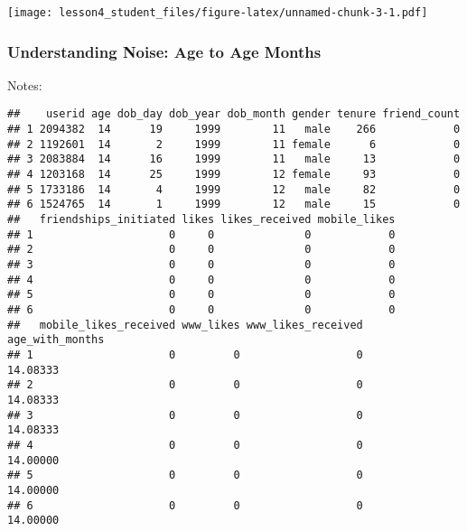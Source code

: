 \documentclass[]{article}
\newenvironment{Shaded}{\begin{snugshade}}{\end{snugshade}}
\newcommand{\KeywordTok}[1]{\textcolor[rgb]{0.13,0.29,0.53}{\textbf{#1}}}
\newcommand{\DataTypeTok}[1]{\textcolor[rgb]{0.13,0.29,0.53}{#1}}
\newcommand{\DecValTok}[1]{\textcolor[rgb]{0.00,0.00,0.81}{#1}}
\newcommand{\StringTok}[1]{\textcolor[rgb]{0.31,0.60,0.02}{#1}}
\newcommand{\OperatorTok}[1]{\textcolor[rgb]{0.81,0.36,0.00}{\textbf{#1}}}
\newcommand{\NormalTok}[1]{#1}
\begin{document}
\begin{Shaded}
\end{Shaded}

\texttt{[image: lesson4\_student\_files/figure-latex/unnamed-chunk-3-1.pdf]}

\subsubsection{Understanding Noise: Age to Age
Months}\label{understanding-noise-age-to-age-months}

Notes:

\begin{Shaded}
\end{Shaded}

\begin{verbatim}
##    userid age dob_day dob_year dob_month gender tenure friend_count
## 1 2094382  14      19     1999        11   male    266            0
## 2 1192601  14       2     1999        11 female      6            0
## 3 2083884  14      16     1999        11   male     13            0
## 4 1203168  14      25     1999        12 female     93            0
## 5 1733186  14       4     1999        12   male     82            0
## 6 1524765  14       1     1999        12   male     15            0
##   friendships_initiated likes likes_received mobile_likes
## 1                     0     0              0            0
## 2                     0     0              0            0
## 3                     0     0              0            0
## 4                     0     0              0            0
## 5                     0     0              0            0
## 6                     0     0              0            0
##   mobile_likes_received www_likes www_likes_received age_with_months
## 1                     0         0                  0        14.08333
## 2                     0         0                  0        14.08333
## 3                     0         0                  0        14.08333
## 4                     0         0                  0        14.00000
## 5                     0         0                  0        14.00000
## 6                     0         0                  0        14.00000
\end{verbatim}
\end{document}
